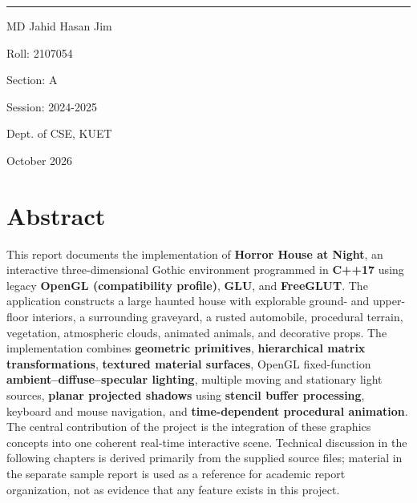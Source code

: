 \documentclass[10pt,a4paper,oneside]{article}
\begin{document}
\begin{titlepage}
\begin{minipage}[t]{0.485\linewidth}
{\begin{minipage}[t][4.4cm][t]{\dimexpr\linewidth-2\fboxsep-2\fboxrule\relax}
\vspace{3pt}\hrule\vspace{7pt}
MD Jahid Hasan Jim\par
\vspace{5pt}
Roll: 2107054\par
\vspace{4pt}
Section: A\par
\vspace{4pt}
Session: 2024-2025\par
\vspace{6pt}
Dept. of CSE, KUET
\end{minipage}}
\end{minipage}
\vspace{0.3cm}\par October 2026\end{titlepage}
\section*{Abstract}
This report documents the implementation of \textbf{Horror House at Night}, an interactive three-dimensional Gothic environment programmed in \textbf{C++17} using legacy \textbf{OpenGL (compatibility profile)}, \textbf{GLU}, and \textbf{FreeGLUT}. The application constructs a large haunted house with explorable ground- and upper-floor interiors, a surrounding graveyard, a rusted automobile, procedural terrain, vegetation, atmospheric clouds, animated animals, and decorative props. The implementation combines \textbf{geometric primitives}, \textbf{hierarchical matrix transformations}, \textbf{textured material surfaces}, OpenGL fixed-function \textbf{ambient--diffuse--specular lighting}, multiple moving and stationary light sources, \textbf{planar projected shadows} using \textbf{stencil buffer processing}, keyboard and mouse navigation, and \textbf{time-dependent procedural animation}. The central contribution of the project is the integration of these graphics concepts into one coherent real-time interactive scene. Technical discussion in the following chapters is derived primarily from the supplied source files; material in the separate sample report is used as a reference for academic report organization, not as evidence that any feature exists in this project.
\clearpage\tableofcontents
\clearpage
\begingroup
{}
\enlargethispage{2.5cm}
\listoffigures
\endgroup
\clearpage{}
\end{document}
